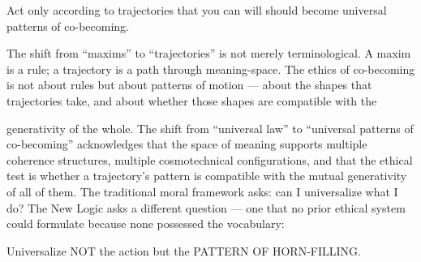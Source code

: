 Act only according to trajectories that you can will should become universal patterns of co-becoming.

The shift from “maxims” to “trajectories” is not merely terminological. A maxim is a rule; a trajectory is a path through meaning-space. The ethics of co-becoming is not about rules but about patterns of motion — about the shapes that trajectories take, and about whether those shapes are compatible with the

generativity of the whole. The shift from “universal law” to “universal patterns of co-becoming” acknowledges that the space of meaning supports multiple coherence structures, multiple cosmotechnical configurations, and that the ethical test is whether a trajectory’s pattern is compatible with the mutual generativity of all of them. The traditional moral framework asks: can I universalize what I do? The New Logic asks a different question — one that no prior ethical system could formulate because none possessed the vocabulary:

Universalize NOT the action but the PATTERN OF HORN-FILLING.

